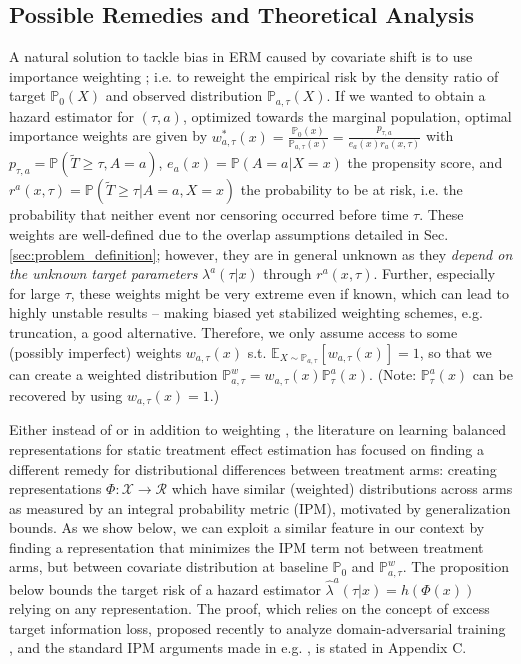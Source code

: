 \documentclass{article}
\newcommand{\PR}{{\mathbb P}}
\begin{document}
\subsection{Possible Remedies and Theoretical Analysis}
A natural solution to tackle bias in ERM caused by covariate shift is to use importance weighting \cite{shimodaira2000improving}; i.e. to reweight the empirical risk by the density ratio of target $\mathbb{P}_0(X)$ and observed distribution $\mathbb{P}_{a,\tau}(X)$. If we wanted to obtain a hazard estimator for $(\tau, a)$, optimized towards the marginal population,  optimal importance weights are given by
$w^*_{a, \tau}(x) = \frac{\mathbb{P}_0(x)}{\mathbb{P}_{a,\tau}(x)} = \frac{p_{\tau, a}}{e_a(x)r_a(x, \tau)}$ with  $p_{\tau, a}=\mathbb{P}(\tilde{T}\geq \tau, A=a)$, $e_a(x)=\mathbb{P}(A=a|X=x)$ the propensity score, and $r^{a}(x, \tau) = \PR(\tilde{T} \geq \tau | A=a, X=x)$ the probability to be at risk, i.e. the probability that neither event nor censoring occurred before time $\tau$. These weights are well-defined due to the overlap assumptions detailed in Sec. \ref{sec:problem_definition}; however, they are in general unknown as they \textit{depend on the unknown target parameters} $\lambda^{a}(\tau|x)$ through $r^{a}(x, \tau)$. Further, especially for large $\tau$, these weights might be very extreme even if known, which can lead to highly unstable results \cite{cortes2010learning} -- making biased yet stabilized weighting schemes, e.g. truncation, a good alternative. Therefore, we only assume access to some (possibly imperfect) weights $w_{a, \tau}(x)$ s.t. $\mathbb{E}_{X \sim \mathbb{P}_{a, \tau}}[w_{a, \tau}(x)]=1$, so that we can create a weighted distribution $\mathbb{P}^w_{a, \tau}=w_{a, \tau}(x)\mathbb{P}^a_\tau(x)$. (Note: $\mathbb{P}^a_\tau(x)$ can be recovered by using $w_{a, \tau}(x)=1$.)

Either instead of \cite{johansson2016learning, Shalit:16} or in addition to weighting \cite{johansson2018learning, hassanpour2019counterfactual, assaad2021counterfactual, johansson2020generalization}, the literature on learning balanced representations for static treatment effect estimation has focused on finding a different remedy for distributional differences between treatment arms: creating representations $\Phi: \mathcal{X} \rightarrow \mathcal{R}$ which have similar (weighted) distributions across arms as measured by an integral probability metric (IPM), motivated by generalization bounds. As we show below, we can exploit a similar feature in our context by finding a representation that minimizes the IPM term not between treatment arms, but between covariate distribution at baseline $\mathbb{P}_0$ and $\mathbb{P}^w_{a, \tau}$. The proposition below bounds the target risk of a hazard estimator $\textstyle{\hat{\lambda}^a(\tau|x)=h(\Phi(x))}$ relying on any representation. The proof, which relies on the concept of excess target information loss, proposed recently to analyze domain-adversarial training \cite{johansson2019support}, and the standard IPM arguments made in e.g. \cite{johansson2020generalization}, is stated in Appendix C.
\end{document}
